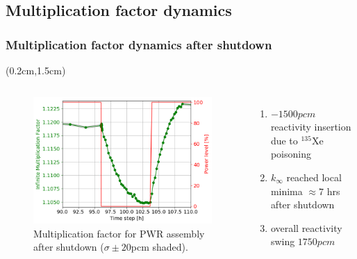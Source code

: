 \subsection{Multiplication factor dynamics}

\begin{frame}
\frametitle{Multiplication factor dynamics after shutdown}
\begin{textblock*}{12.5cm}(0.2cm,1.5cm) %
\begin{columns}
	\column[t]{6cm}
	\begin{figure}[t]
		\includegraphics[width=\linewidth]{./images/pwr_keff_zoomed.png}
		\vspace{-6mm}
		\caption{Multiplication factor for
PWR assembly after 
		shutdown ($\sigma\pm20$pcm shaded).}
	\end{figure}
		\vspace{-5mm}
	\begin{enumerate}             
		\item $-1500pcm$ reactivity insertion due to $^{135}$Xe poisoning
		\item $k_{\infty}$ reached local minima $\approx7$ hrs after shutdown
		\item overall reactivity swing $1750pcm$
	\end{enumerate}

	\column[t]{6cm}
\end{columns}
\end{textblock*}
\end{frame}
